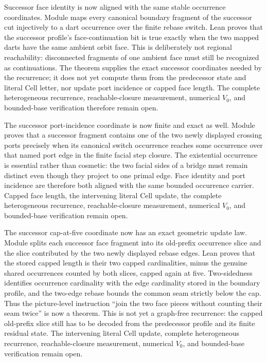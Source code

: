 \documentclass[11pt]{article}
\theoremstyle{definition}
\begin{document}
Successor face identity is now aligned with the same stable occurrence
coordinates.  Module
maps every canonical boundary fragment of the successor cut injectively to a
dart occurrence over the finite rebase switch.  Lean proves that the
successor profile's face-continuation bit is true exactly when the two mapped
darts have the same ambient orbit face.  This is deliberately not regional
reachability: disconnected fragments of one ambient face must still be
recognized as continuations.  The theorem supplies the exact successor
coordinates needed by the recurrence; it does not yet compute them from the
predecessor state and literal Cell letter, nor update port incidence or capped
face length.  The complete heterogeneous recurrence, reachable-closure
measurement, numerical $V_0$, and bounded-base verification therefore remain
open.

The successor port-incidence coordinate is now finite and exact as well.
Module
proves that a successor fragment contains one of the two newly displayed
crossing ports precisely when its canonical switch occurrence reaches some
occurrence over that named port edge in the finite facial step closure.  The
existential occurrence is essential rather than cosmetic: the two facial
sides of a bridge must remain distinct even though they project to one primal
edge.  Face identity and port incidence are therefore both aligned with the
same bounded occurrence carrier.  Capped face length, the intervening literal
Cell update, the complete heterogeneous recurrence, reachable-closure
measurement, numerical $V_0$, and bounded-base verification remain open.

The successor cap-at-five coordinate now has an exact geometric update law.
Module
splits each successor face fragment into its old-prefix occurrence slice and
the slice contributed by the two newly displayed rebase edges.  Lean proves
that the stored capped length is their two capped cardinalities, minus the
genuine shared occurrences counted by both slices, capped again at five.
Two-sidedness identifies occurrence cardinality with the edge cardinality
stored in the boundary profile, and the two-edge rebase bounds the common seam
strictly below the cap.  Thus the picture-level instruction ``join the two
face pieces without counting their seam twice'' is now a theorem.  This is not
yet a graph-free recurrence: the capped old-prefix slice still has to be
decoded from the predecessor profile and its finite residual state.  The
intervening literal Cell update, complete heterogeneous recurrence,
reachable-closure measurement, numerical $V_0$, and bounded-base verification
remain open.
\end{document}

